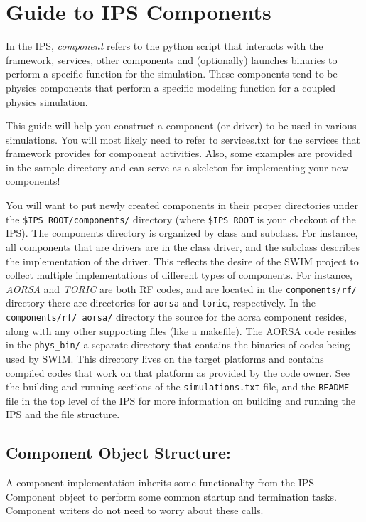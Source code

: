\section{Guide to IPS Components}
\label{sec:components}

In the IPS, \emph{component} refers to the python script that interacts with the 
framework, services, other components and (optionally) launches binaries to 
perform a specific function for the simulation.  These components tend to 
be physics components that perform a specific modeling function for a 
coupled physics simulation.

This guide will help you construct a component (or driver) to be used in 
various simulations.  You will most likely need to refer to services.txt 
for the services that framework provides for component activities.  Also, 
some examples are provided in the sample directory and can serve as a 
skeleton for implementing your new components!

You will want to put newly created components in their proper directories 
under the \texttt{\$IPS\_ROOT/components/} directory (where \texttt{\$IPS\_ROOT} is your 
checkout of the IPS).  The components directory is organized by class and 
subclass.  For instance, all components that are drivers are in the class 
driver, and the subclass describes the implementation of the driver.  This 
reflects the desire of the SWIM project to collect multiple implementations 
of different types of components.  For instance, \emph{AORSA} and \emph{TORIC} are both 
RF codes, and are located in the \texttt{components/rf/} directory there are 
directories for \texttt{aorsa} and \texttt{toric}, respectively.  In the \texttt{components/rf/
aorsa/} directory the source for the aorsa component resides, along with 
any other supporting files (like a makefile).  The AORSA code resides in 
the \texttt{phys\_bin/} a separate directory that contains the binaries of codes 
being used by SWIM.  This directory lives on the target platforms and 
contains compiled codes that work on that platform as provided by the code 
owner.  See the building and running sections of the \texttt{simulations.txt} file, 
and the \texttt{README} file in the top level of the IPS for more information on 
building and running the IPS and the file structure.

\subsection{Component Object Structure:}
\label{sec:comp_struct}
A component implementation inherits some functionality from the IPS Component 
object to perform some common startup and termination tasks.  Component 
writers do not need to worry about these calls.

